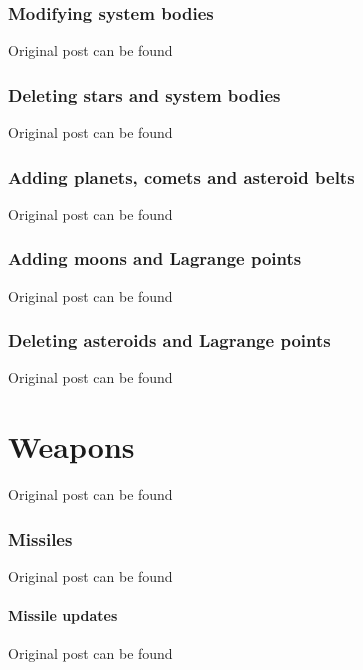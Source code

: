 \documentclass[10pt,a4paper,oneside]{article}
\begin{document}
\section{Modifying system bodies}
Original post can be found

\section{Deleting stars and system bodies}
Original post can be found

\section{Adding planets, comets and asteroid belts}
Original post can be found

\section{Adding moons and Lagrange points}
Original post can be found

\section{Deleting asteroids and Lagrange points}
Original post can be found


\newpage
\part{Weapons}
Original post can be found

\section{Missiles}
Original post can be found

\subsection{Missile updates}
Original post can be found
\end{document}
